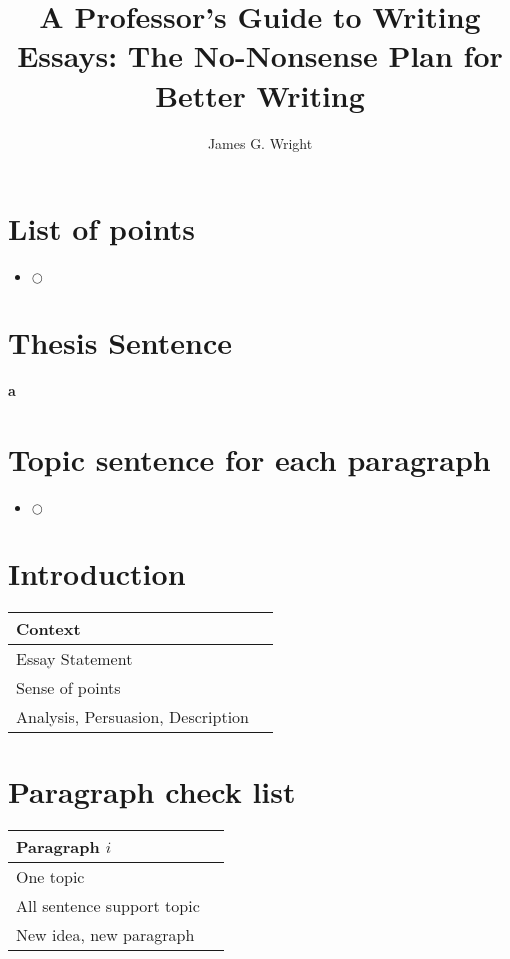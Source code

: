 \documentclass[10pt,a4paper]{article}
\begin{document}
\title{A Professor's Guide to Writing Essays: The No-Nonsense Plan for Better Writing\cite{neumann2016professor}}
\author{James G. Wright }
\maketitle
\section{List of points}
\begin{itemize}
	\item $\bigcirc$
\end{itemize}
\section{Thesis Sentence}
\textbf{a}
\section{Topic sentence for each paragraph}
\begin{itemize}
	\item $\bigcirc$
\end{itemize}
\section{Introduction}
\begin{center}
	\begin{tabular}{|l|l|}
		\hline
		Context &\\
		\hline
		Essay Statement &\\
		\hline
		Sense of points &\\
		\hline
		Analysis, Persuasion, Description &\\
		\hline
	\end{tabular}
\end{center}
\section{Paragraph check list}
\begin{center}
	\begin{tabular}{|l|l|}
		\hline
		Paragraph $i$&\\
		\hline
		One topic &\\
		\hline
		All sentence support topic &\\
		\hline
		New idea, new paragraph&\\
		\hline
	\end{tabular}
\end{center}
\end{document}
